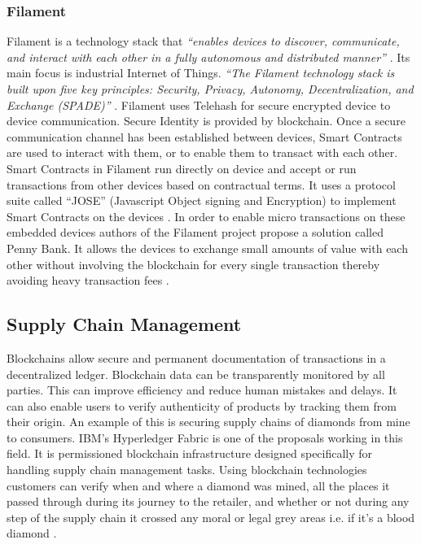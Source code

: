 \subsubsection{Filament} \label{Filament}
Filament is a technology stack that \textit{“enables devices to discover, communicate, and interact with each other in a fully autonomous and distributed manner”} \cite{misc:006}. Its main focus is industrial Internet of Things. \textit{“The Filament technology stack is built upon five key principles: Security, Privacy, Autonomy, Decentralization, and Exchange (SPADE)”} \cite{misc:006}. Filament uses Telehash for secure encrypted device to device communication. Secure Identity is provided by blockchain. Once a secure communication channel has been established between devices, Smart Contracts are used to interact with them, or to enable them to transact with each other. Smart Contracts in Filament run directly on device and accept or run transactions from other devices based on contractual terms. It uses a protocol suite called “JOSE” (Javascript Object signing and Encryption) to implement Smart Contracts on the devices \cite{misc:007}. In order to enable micro transactions on these embedded devices authors of the Filament project propose a solution called Penny Bank. It allows the devices to exchange small amounts of value with each other without involving the blockchain for every single transaction thereby avoiding heavy transaction fees \cite{misc:006}.
\vspace{0.5cm}  
\subsection{Supply Chain Management}
Blockchains allow secure and permanent documentation of transactions in a decentralized ledger. Blockchain data can be transparently monitored by all parties. This can improve efficiency and reduce human mistakes and delays. It can also enable users to verify authenticity of products by tracking them from their origin. An example of this is securing supply chains of diamonds from mine to consumers. IBM’s Hyperledger Fabric is one of the proposals working in this field. It is permissioned blockchain infrastructure designed specifically for handling supply chain management tasks. Using blockchain technologies customers can verify when and where a diamond was mined, all the places it passed through during its journey to the retailer, and whether or not during any step of the supply chain it crossed any moral or legal grey areas i.e. if it’s a blood diamond \cite{misc:014}.
\vspace{0.5cm}  
